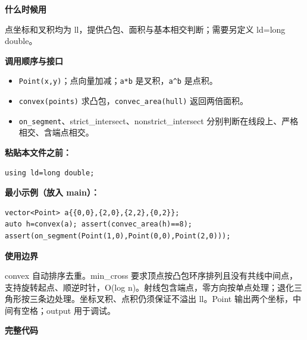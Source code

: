 \documentclass[UTF8,a4paper,10pt]{ctexart}
\newcommand{\TemplUsage}[1]{\textbf{什么时候用}\par #1\par}
\newcommand{\TemplApi}[1]{\textbf{调用顺序与接口}\par #1\par}
\newcommand{\TemplNote}[1]{\textbf{使用边界}\par #1\par}
\begin{document}
\TemplUsage{点坐标和叉积均为 ll，提供凸包、面积与基本相交判断；需要另定义 ld=long double。}
\TemplApi{\begin{itemize}
\item \texttt{Point(x,y)}；点向量加减；\texttt{a*b} 是叉积，\texttt{a\textasciicircum{}b} 是点积。
\item \texttt{convex(points)} 求凸包，\texttt{convec\_area(hull)} 返回两倍面积。
\item \texttt{on\_segment}、strict\_intersect、nonstrict\_intersect 分别判断在线段上、严格相交、含端点相交。
\end{itemize}}
\textbf{粘贴本文件之前：}
\begin{lstlisting}
using ld=long double;
\end{lstlisting}
\textbf{最小示例（放入 main）：}
\begin{lstlisting}
vector<Point> a{{0,0},{2,0},{2,2},{0,2}};
auto h=convex(a); assert(convec_area(h)==8);
assert(on_segment(Point(1,0),Point(0,0),Point(2,0)));
\end{lstlisting}
\TemplNote{convex 自动排序去重。min\_cross 要求顶点按凸包环序排列且没有共线中间点，支持旋转起点、顺逆时针，O(log n)。射线包含端点，零方向按单点处理；退化三角形按三条边处理。坐标叉积、点积仍须保证不溢出 ll。Point 输出两个坐标，中间有空格；output 用于调试。}
\textbf{完整代码}
\end{document}

